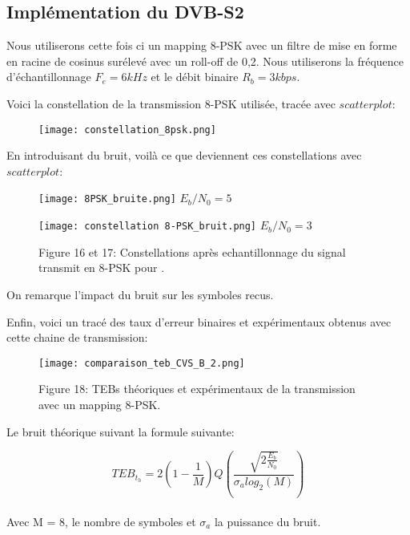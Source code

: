 \documentclass[englishb]{article}
\begin{document}
\subsection{Implémentation du DVB-S2}

 Nous utiliserons cette fois ci un mapping 8-PSK avec un filtre de mise en forme en racine de cosinus surélevé avec un roll-off de 0,2. Nous utiliserons la fréquence d'échantillonnage $F_e=6kHz$ et le débit binaire $R_b=3kbps$.

 Voici la constellation de la transmission 8-PSK utilisée, tracée avec $scatterplot$:
\begin{figure}[H]
    \centering
    \texttt{[image: constellation\_8psk.png]}
\end{figure}

En introduisant du bruit, voilà ce que deviennent ces constellations avec $scatterplot$:

\begin{figure}[H]
    \centering
   \begin{minipage}[b]{0.40\linewidth}
      \centering \texttt{[image: 8PSK\_bruite.png]}
      $E_b/N_0=5$
   \end{minipage}\hfill
   \begin{minipage}[b]{0.48\linewidth}   
      \centering \texttt{[image: constellation 8-PSK\_bruit.png]}
      $E_b/N_0=3$
   \end{minipage}
   
   Figure 16 et 17: Constellations après echantillonnage du signal transmit en 8-PSK pour \in [| 3,5 \right}|].
\end{figure}

On remarque l'impact du bruit sur les symboles recus.

Enfin, voici un tracé des taux d'erreur binaires et expérimentaux obtenus avec cette chaine de transmission:
\begin{figure}[H]
    \centering
    \texttt{[image: comparaison\_teb\_CVS\_B\_2.png]}

    Figure 18: TEBs théoriques et expérimentaux de la transmission avec un mapping 8-PSK.
\end{figure}

Le bruit théorique suivant la formule suivante:

\begin{center}

$$TEB_t_h=2(1-\frac{1}{M})Q(\frac{\sqrt{2\frac{E_b}{N_0}}}{\sigma_a log_2(M)})$$\\


    
    Avec M = 8, le nombre de symboles et $\sigma_a$ la puissance du bruit.
    
\end{center}
\end{document}
